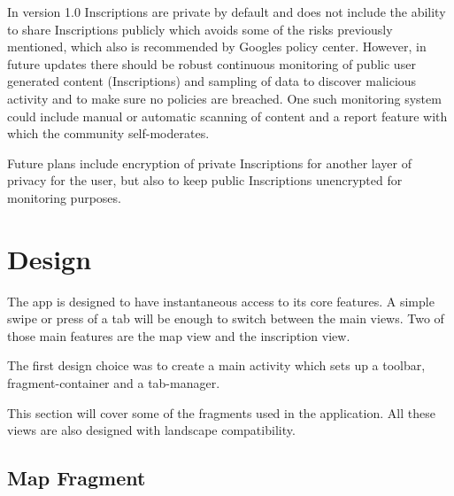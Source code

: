 \documentclass[]{article}
\begin{document}
\begin{flushleft}
In version 1.0 Inscriptions are private by default and does not include the ability to share Inscriptions publicly which avoids some of the risks previously mentioned, which also is recommended by Googles policy center\parencite{enforcement}.
 However, in future updates there should be robust continuous monitoring of public user generated content (Inscriptions) and sampling of data to discover malicious activity and to make sure no policies are breached. One such monitoring system could include manual or automatic scanning of content and a report feature with which the community self-moderates\parencite{usergen}.\medskip

Future plans include encryption of private Inscriptions for another layer of privacy for the user, but also to keep public Inscriptions unencrypted for monitoring purposes.

\newpage

\section {Design}

The app is designed to have instantaneous access to its core features. A simple swipe or press of a tab will be enough to switch between the main views. Two of those main features are the map view and the inscription view.\medskip

The first design choice was to create a main activity which sets up a toolbar, fragment-container and a tab-manager.\medskip

This section will cover some of the fragments used in the application. All these views are also designed with landscape compatibility.

\subsection{Map Fragment}


\end{flushleft}
\end{document}
